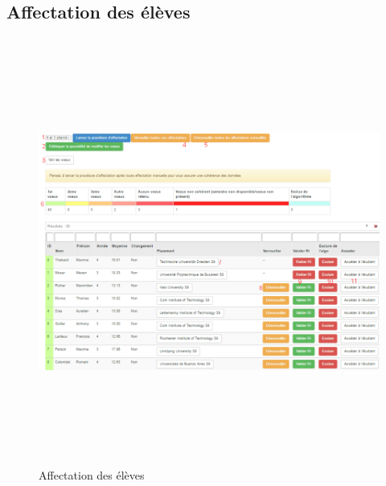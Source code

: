     \subsection{Affectation des élèves}
    \label{ae}
    \begin{figure}[H]
    	\centering
    	\includegraphics[width=16cm,height=14cm]{Images/Admin/moulinette_admin.png}
    	\caption{Affectation des élèves}
    	
    \end{figure}
